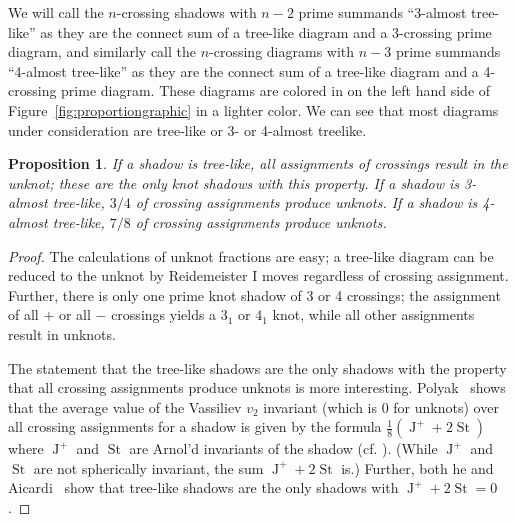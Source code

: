 \documentclass[amsmath,secnumarabic,amssymb,floatfix,nofootinbib,nobibnotes,letterpaper,11pt,tightenlines,showkeys]{revtex4}
\newtheorem{proposition}[theorem]{Proposition}
\theoremstyle{definition}
\let\mgp=\marginpar \marginparwidth18mm \marginparsep1mm
\def\marginpar#1{\mgp{\raggedright\tiny #1}}
\let\lbl=\label
\def\label#1{\lbl{#1}\ifinner\else\marginpar{\ref{#1} #1}\ignorespaces\fi}
\begin{document}

We will call the $n$-crossing shadows with $n-2$ prime summands ``3-almost tree-like'' as they are the connect sum of a tree-like diagram and a 3-crossing prime diagram, and similarly call the $n$-crossing diagrams with $n-3$ prime summands ``4-almost tree-like'' as they are the connect sum of a tree-like diagram and a 4-crossing prime diagram. These diagrams are colored in on the left hand side of Figure~\ref{fig:proportiongraphic} in a lighter color. We can see that most diagrams under consideration are tree-like or 3- or 4-almost treelike.

\begin{proposition}
If a shadow is tree-like, all assignments of crossings result in the unknot; these are the only knot shadows with this property. If a shadow is 3-almost tree-like, $3/4$ of crossing assignments produce unknots. If a shadow is 4-almost tree-like, $7/8$ of crossing assignments produce unknots.
\label{prop:almost treelike mostly unknots}
\end{proposition}

\begin{proof}
The calculations of unknot fractions are easy; a tree-like diagram can be reduced to the unknot by Reidemeister I moves regardless of crossing assignment. Further, there is only one prime knot shadow of 3 or 4 crossings; the assignment of all $+$ or all $-$ crossings yields a $3_1$ or $4_1$ knot, while all other assignments result in unknots.

The statement that the tree-like shadows are the only shadows with the property that all crossing assignments produce unknots is more interesting. Polyak~\cite{Polyak:1998wa} shows that the average value of the Vassiliev $v_2$ invariant (which is $0$ for unknots) over all crossing assignments for a shadow is given by the formula $\frac{1}{8}(\operatorname{J}^+ + 2 \operatorname{St})$ where $\operatorname{J}^+$ and $\operatorname{St}$ are Arnol'd invariants of the shadow (cf. \cite{Arnold:1994wr}). (While $\operatorname{J}^+$ and $\operatorname{St}$ are not spherically invariant, the sum $\operatorname{J}^+ + 2\operatorname{St}$ is.) Further, both he and Aicardi~\cite{Aicardi:1994uq} show that tree-like shadows are the only shadows with $\operatorname{J}^+ + 2 \operatorname{St} = 0$.
\end{proof}
\end{document}

